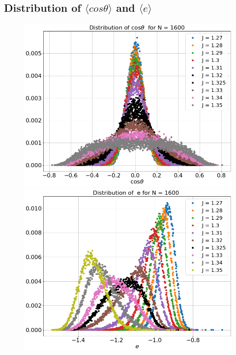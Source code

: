 \subsection{Distribution of $\langle cos \theta \rangle$ and $\langle e \rangle$ }
  \begin{figure}[H]
 	\centering
 	\includegraphics[scale=0.25]{Images/distr_cos_1600.png}
 	\includegraphics[scale=0.25]{Images/distr_energy_1600.png} \\

\end{figure}
